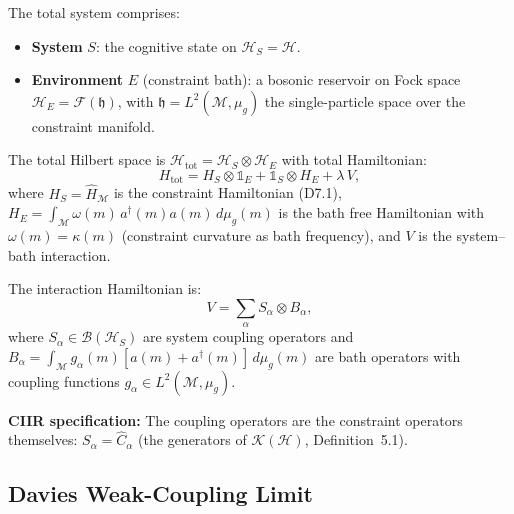 \begin{definition}
\label{def:c9:total}
The total system comprises:
\begin{itemize}
\item \textbf{System} $S$: the cognitive state on $\mathcal{H}_S = \mathcal{H}$.
\item \textbf{Environment} $E$ (constraint bath): a bosonic reservoir on
  Fock space $\mathcal{H}_E = \mathcal{F}(\mathfrak{h})$, with
  $\mathfrak{h} = L^2(\mathcal{M}, \mu_g)$ the single-particle space
  over the constraint manifold.
\end{itemize}
The total Hilbert space is $\mathcal{H}_{\mathrm{tot}} = \mathcal{H}_S
\otimes \mathcal{H}_E$ with total Hamiltonian:
\begin{equation}
  H_{\mathrm{tot}} = H_S \otimes \mathbb{1}_E
    + \mathbb{1}_S \otimes H_E
    + \lambda\, V,
  \label{eq:c9:htot}
\end{equation}
where $H_S = \hat{H}_{\mathcal{M}}$ is the constraint Hamiltonian (D7.1),
$H_E = \int_{\mathcal{M}} \omega(m)\, a^\dagger(m) a(m)\, d\mu_g(m)$ is
the bath free Hamiltonian with $\omega(m) = \kappa(m)$ (constraint
curvature as bath frequency), and $V$ is the system--bath interaction.
\end{definition}

\begin{definition}
\label{def:c9:interaction}
The interaction Hamiltonian is:
\begin{equation}
  V = \sum_{\alpha} S_\alpha \otimes B_\alpha,
  \label{eq:c9:interaction}
\end{equation}
where $S_\alpha \in \mathcal{B}(\mathcal{H}_S)$ are system coupling
operators and $B_\alpha = \int_{\mathcal{M}} g_\alpha(m)
[a(m) + a^\dagger(m)]\, d\mu_g(m)$ are bath operators with coupling
functions $g_\alpha \in L^2(\mathcal{M}, \mu_g)$.

\textbf{CIIR specification:}  The coupling operators are the constraint
operators themselves: $S_\alpha = \hat{C}_\alpha$ (the generators of
$\mathcal{K}(\mathcal{H})$, Definition~5.1).
\end{definition}


\subsection{Davies Weak-Coupling Limit}

